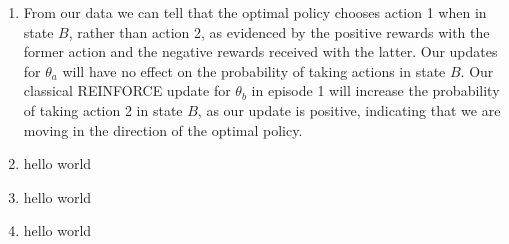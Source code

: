\documentclass{article}
\begin{document}
\begin{enumerate}
\begin{enumerate}
	      \end{enumerate}
	\item From our data we can tell that the optimal policy chooses action 1 when in state $B$,
	      rather than action 2, as evidenced by the positive rewards with the former action and the
	      negative rewards received with the latter. Our updates for $\theta_a$ will have no effect on
	      the probability of taking actions in state $B$. Our classical REINFORCE update for
	      $\theta_b$ in episode 1 will increase the probability of taking action 2 in state $B$, as
	      our update is positive, indicating that we are moving in the direction of the optimal
	      policy.
	\item hello world
	\item hello world
	\item hello world
\end{enumerate}
\end{document}
